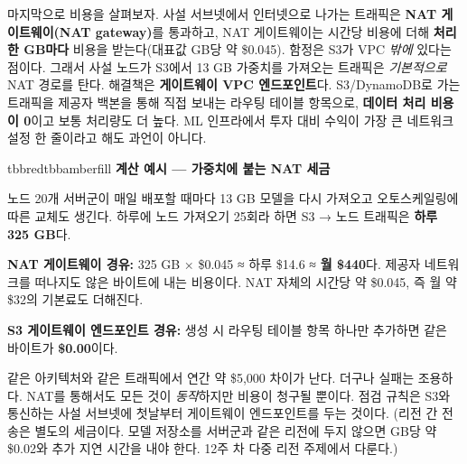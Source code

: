 마지막으로 비용을 살펴보자. 사설 서브넷에서 인터넷으로 나가는 트래픽은 \textbf{NAT 게이트웨이(NAT gateway)}를 통과하고, NAT 게이트웨이는 시간당 비용에 더해 \textbf{처리한 GB마다} 비용을 받는다(대표값 GB당 약 \$0.045). 함정은 S3가 VPC \textit{밖에} 있다는 점이다. 그래서 사설 노드가 S3에서 13 GB 가중치를 가져오는 트래픽은 \textit{기본적으로} NAT 경로를 탄다. 해결책은 \textbf{게이트웨이 VPC 엔드포인트}다. S3/DynamoDB로 가는 트래픽을 제공자 백본을 통해 직접 보내는 라우팅 테이블 항목으로, \textbf{데이터 처리 비용이 0}이고 보통 처리량도 더 높다. ML 인프라에서 투자 대비 수익이 가장 큰 네트워크 설정 한 줄이라고 해도 과언이 아니다.

\begin{calloutbox}{tbbred}{tbbamberfill}
{\normalsize\bfseries\color{tbbamberdark}계산 예시 — 가중치에 붙는 NAT 세금}\par\vspace{3pt}
노드 20개 서버군이 매일 배포할 때마다 13 GB 모델을 다시 가져오고 오토스케일링에 따른 교체도 생긴다. 하루에 노드 가져오기 25회라 하면 S3 → 노드 트래픽은 \textbf{하루 325 GB}다.

\begin{tbbitemize}
  \item \textbf{NAT 게이트웨이 경유:} 325 GB × \$0.045 ≈ 하루 \$14.6 ≈ \textbf{월 \$440}다. 제공자 네트워크를 떠나지도 않은 바이트에 내는 비용이다. NAT 자체의 시간당 약 \$0.045, 즉 월 약 \$32의 기본료도 더해진다.
  \item \textbf{S3 게이트웨이 엔드포인트 경유:} 생성 시 라우팅 테이블 항목 하나만 추가하면 같은 바이트가 \textbf{\$0.00}이다.
\end{tbbitemize}

같은 아키텍처와 같은 트래픽에서 연간 약 \$5,000 차이가 난다. 더구나 실패는 조용하다. NAT를 통해서도 모든 것이 \textit{동작}하지만 비용이 청구될 뿐이다. 점검 규칙은 S3와 통신하는 사설 서브넷에 첫날부터 게이트웨이 엔드포인트를 두는 것이다. (리전 간 전송은 별도의 세금이다. 모델 저장소를 서버군과 같은 리전에 두지 않으면 GB당 약 \$0.02와 추가 지연 시간을 내야 한다. 12주 차 다중 리전 주제에서 다룬다.)
\end{calloutbox}

\vspace{3.0pt}

